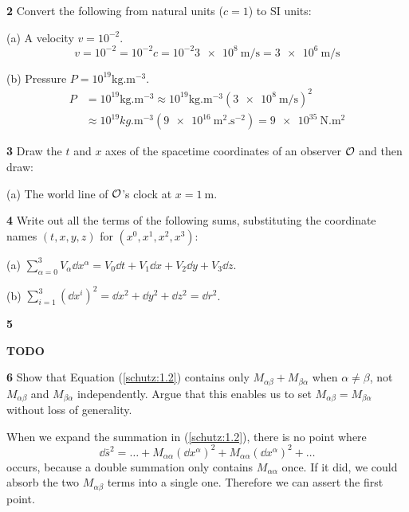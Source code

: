 \documentclass[gr-notes.tex]{subfiles}
\begin{document}
\textbf{2}
Convert the following from natural units ($c = 1$) to SI units:

(a) A velocity $v = 10^{-2}$.
\begin{displaymath}
  v = 10^{-2} =
  10^{-2} c =
  10^{-2} \SI{3e8}{\meter\per\second} =
  \SI{3e6}{\meter\per\second}
\end{displaymath}

(b) Pressure $P = 10^{19} \si{\kilogram.\meter^{-3}}$.
\begin{align*}
  P &=
  10^{19} \si{\kilogram.\meter^{-3}} \approx
  10^{19} \si{\kilogram.\meter^{-3}} (\SI{3e8}{\meter\per\second})^2
  \\ &\approx
  10^{19} \si{kg.\meter^{-3}} (\SI{9e16}{\meter^2.\second^{-2}}) =
  \SI{9e35}{\newton.\meter^2}
\end{align*}


\textbf{3}
Draw the $t$ and $x$ axes of the spacetime coordinates of an observer $\mathcal{O}$ and then draw:

(a) The world line of $\mathcal{O}$'s clock at $x = \SI{1}{\meter}$.



\textbf{4}
Write out all the terms of the following sums, substituting the coordinate names $(t, x, y, z)$ for $(x^0, x^1, x^2, x^3)$:

(a)
$\sum_{\alpha=0}^3 V_\alpha \dd{x^\alpha} =
 V_0 \dd{t} + V_1 \dd{x} + V_2 \dd{y} + V_3 \dd{z}$.

(b)
$\sum_{i=1}^3 (\dd{x^i})^2 =
 \dd{x}^2 + \dd{y}^2 + \dd{z}^2 = \dd{r}^2$.


\textbf{5}

\textbf{TODO}



\textbf{6}
Show that Equation (\ref{schutz:1.2}) contains only $M_{\alpha\beta} + M_{\beta\alpha}$ when $\alpha \neq \beta$, not $M_{\alpha\beta}$ and $M_{\beta\alpha}$ independently. Argue that this enables us to set $M_{\alpha\beta} = M_{\beta\alpha}$ without loss of generality.

When we expand the summation in (\ref{schutz:1.2}), there is no point where
%
\begin{displaymath}
  \dd{\bar{s}}^2 =
  \ldots +
  M_{\alpha\alpha} (\dd{x^\alpha})^2 +
  M_{\alpha\alpha} (\dd{x^\alpha})^2 +
  \ldots
\end{displaymath}
occurs, because a double summation only contains $M_{\alpha\alpha}$ once. If it did, we could absorb the two $M_{\alpha\beta}$ terms into a single one. Therefore we can assert the first point.
\end{document}
